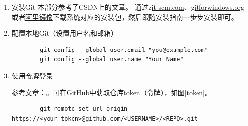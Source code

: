 \begin{enumerate}
    \item 安装Git
          本部分参考了CSDN上的文章\cite{git-install}。
          通过\href{https://git-scm.com/}{git-scm.com}、\href{https://gitforwindows.org/}{gitforwindows.org}或者\href{https://registry.npmmirror.com/binary.html?path=git-for-windows/}{阿里镜像}下载系统对应的安装包，然后跟随安装指南一步步安装即可。

    \item 配置本地Git（设置用户名和邮箱）
          \begin{lstlisting}
        git config --global user.email "you@example.com"
        git config --global user.name "Your Name"
    \end{lstlisting}

    \item 使用令牌登录

          参考文章：\cite{github-repo}。可在GitHub中获取仓库token（令牌），如图\ref{token}。
          \begin{lstlisting}
        git remote set-url origin https://<your_token>@github.com/<USERNAME>/<REPO>.git
    \end{lstlisting}


\end{enumerate}

